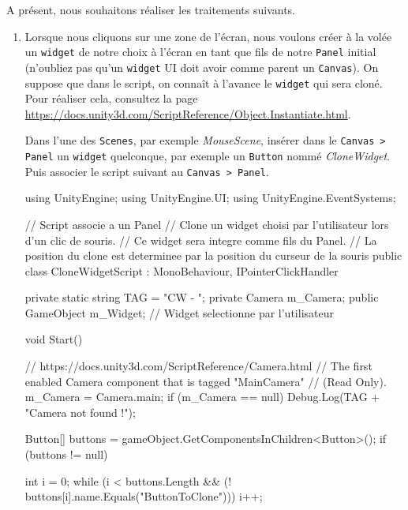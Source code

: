 \documentclass[a4paper,10pt]{article}
\newenvironment{solution}%
{\begin{tcolorbox}[breakable,colback=red!5!white,colframe=red!75!black,title=Solution]}%
{\end{tcolorbox}}
\newenvironment{boxcode}%
{\begin{tcolorbox}[breakable,colback=gray!5!white,colframe=black]}%
	{\end{tcolorbox}}
\begin{document}
A présent, nous souhaitons réaliser les traitements suivants.
\begin{enumerate}
	\item  Lorsque nous cliquons sur une zone de l'écran, nous voulons créer à la volée un \texttt{widget} de notre choix à l'écran en tant que fils de notre \texttt{Panel} initial (n'oubliez pas qu'un \texttt{widget} UI doit avoir comme parent un \texttt{Canvas}). On suppose que dans le script, on connaît à l'avance le \texttt{widget} qui sera cloné.
	Pour réaliser cela, consultez  la page \url{https://docs.unity3d.com/ScriptReference/Object.Instantiate.html}. \\	
	
	
\ifversionenseignant
\begin{solution}
Dans l'une des \texttt{Scenes}, par exemple \textit{MouseScene}, insérer dans le \texttt{Canvas > Panel} un \texttt{widget} quelconque, par exemple un \texttt{Button} nommé \textit{CloneWidget}.	\\

Puis associer le script suivant au \texttt{Canvas > Panel}.

\begin{boxcode}
\begin{csharpsansbord}
using UnityEngine;
using UnityEngine.UI;
using UnityEngine.EventSystems;

// Script associe a un Panel
// Clone un widget choisi par l'utilisateur lors d'un clic de souris.
// Ce widget sera integre comme fils du Panel.
// La position du clone est determinee par la position du curseur de la souris 
public class CloneWidgetScript : MonoBehaviour, IPointerClickHandler
{
	private static string TAG = "CW - ";
	private Camera m_Camera;
	public GameObject m_Widget; // Widget selectionne par l'utilisateur
	
	void Start() {
		// https://docs.unity3d.com/ScriptReference/Camera.html
		// The first enabled Camera component that is tagged "MainCamera"
		//  (Read Only).
		m_Camera = Camera.main;
		if (m_Camera == null) {	Debug.Log(TAG + "Camera not found !");	}
		
		Button[] buttons = gameObject.GetComponentsInChildren<Button>();
		if (buttons != null) {
			int i = 0;
			while (i < buttons.Length &&
			(! buttons[i].name.Equals("ButtonToClone"))) { i++;	}
			
}}}
\end{csharpsansbord}
\end{boxcode}
\end{solution}
\end{enumerate}
\end{document}
